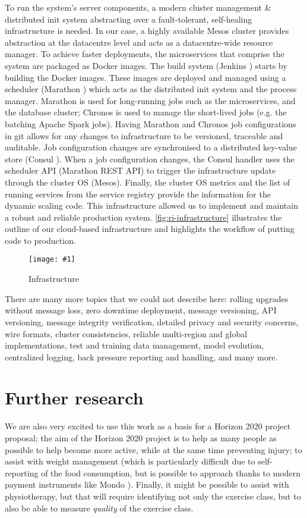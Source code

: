 \documentclass[a4paper, 10 pt, conference]{IEEEtran}
\newcommand{\fig}[3]{
  \begin{figure}[h]
    \begin{center}
        \caption{#3}
        \texttt{[image: \#1]}
        \label{fig:#2}
    \end{center}
  \end{figure}
}
\begin{document}
To run the system's server components, a modern cluster management \& distributed init system abstracting over a fault-tolerant, self-healing infrastructure is needed. In our case, a highly available Mesos \cite{mesos} cluster provides abstraction at the datacentre level and acts as a datacentre-wide resource manager. To achieve faster deployments, the microservices that comprise the system are packaged as Docker \cite{docker} images. The build system (Jenkins \cite{jenkins}) starts by building the Docker images. These images are deployed and managed using a scheduler (Marathon \cite{marathon}) which acts as the distributed init system and the process manager. Marathon is used for long-running jobs such as the microservices, and the database cluster; Chronos \cite{chronos} is used to manage the short-lived jobs (e.g. the batching Apache Spark jobs). Having Marathon and Chronos job configurations in git allows for any changes to infrastructure to be versioned, traceable and auditable. Job configuration changes are synchronised to a distributed key-value store (Consul \cite{consul}). When a job configuration changes, the Consul handler uses the scheduler API (Marathon REST API) to trigger the infrastructure update through the cluster OS (Mesos). Finally, the cluster OS metrics and the list of running services from the service registry provide the information for the dynamic scaling code.
This infrastructure allowed us to implement and maintain a robust and reliable production system. \autoref{fig:ri-infrastructure} illustrates the outline of our cloud-based infrastructure and highlights the workflow of putting code to production.

\fig{ri-infrastructure.png}{ri-infrastructure}{Infrastructure}

There are many more topics that we could not describe here: rolling upgrades without message loss, zero downtime deployment, message versioning, API versioning, message integrity verification, detailed privacy and security concerns, wire formats, cluster consistencies, reliable multi-region and global implementations, test and training data management, model evolution, centralized logging, back pressure reporting and handling, and many more. 

\section{Further research}

We are also very excited to use this work as a basis for a Horizon 2020 \cite{horizon2020} project proposal; the aim of the Horizon 2020 project is to help as many people as possible to help become more active, while at the same time preventing injury; to assist with weight management (which is particularly difficult due to self-reporting of the food consumption, but is possible to approach thanks to modern payment instruments like Mondo \cite{mondo}). Finally, it might be possible to assist with physiotherapy, but that will require identifying not only the exercise class, but to also be able to measure \emph{quality} of the exercise class.
\end{document}
